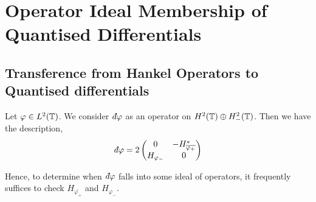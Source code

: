 
\chapter{Operator Ideal Membership of Quantised Differentials} %

\label{IdealMembership} %


\section{Transference from Hankel Operators to Quantised differentials}
Let $\varphi \in L^2(\mathbb{T})$. We consider $\qd \varphi$
as an operator on $H^2(\mathbb{T})\oplus H^2_-(\mathbb{T})$. Then we have the description,
\begin{equation}
\label{quantumMatrix}
    \qd \varphi = 2\begin{pmatrix}
        0 & -H_{\overline{\varphi_+}}^*\\
        H_{\varphi_-}  & 0
    \end{pmatrix}
\end{equation}

Hence, to determine when $\qd \varphi$ falls into some ideal of operators,
it frequently suffices to check $H_{\overline{\varphi_+}}$ and $H_{\varphi_-}$.


